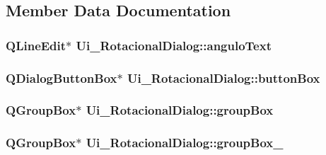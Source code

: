 \subsection{Member Data Documentation}
\hypertarget{class_ui___rotacional_dialog_a834fe25a665d4a99446e1fc9a28c8a14}{
\subsubsection[{angulo\-Text}]{\setlength{\rightskip}{0pt plus 5cm}Q\-Line\-Edit$\ast$ Ui\-\_\-\-Rotacional\-Dialog\-::angulo\-Text}}\label{class_ui___rotacional_dialog_a834fe25a665d4a99446e1fc9a28c8a14}
\hypertarget{class_ui___rotacional_dialog_a13f390b4593075163c96f55bd7c61343}{
\subsubsection[{button\-Box}]{\setlength{\rightskip}{0pt plus 5cm}Q\-Dialog\-Button\-Box$\ast$ Ui\-\_\-\-Rotacional\-Dialog\-::button\-Box}}\label{class_ui___rotacional_dialog_a13f390b4593075163c96f55bd7c61343}
\hypertarget{class_ui___rotacional_dialog_a971ceda901e9a6c54eed1131e7f1c5a8}{
\subsubsection[{group\-Box}]{\setlength{\rightskip}{0pt plus 5cm}Q\-Group\-Box$\ast$ Ui\-\_\-\-Rotacional\-Dialog\-::group\-Box}}\label{class_ui___rotacional_dialog_a971ceda901e9a6c54eed1131e7f1c5a8}
\hypertarget{class_ui___rotacional_dialog_ae84f45d3417cced094876f1cdc486978}{
\subsubsection[{group\-Box\-\_\-2}]{\setlength{\rightskip}{0pt plus 5cm}Q\-Group\-Box$\ast$ Ui\-\_\-\-Rotacional\-Dialog\-::group\-Box\-\_}}\label{class_ui___rotacional_dialog_ae84f45d3417cced094876f1cdc486978}
